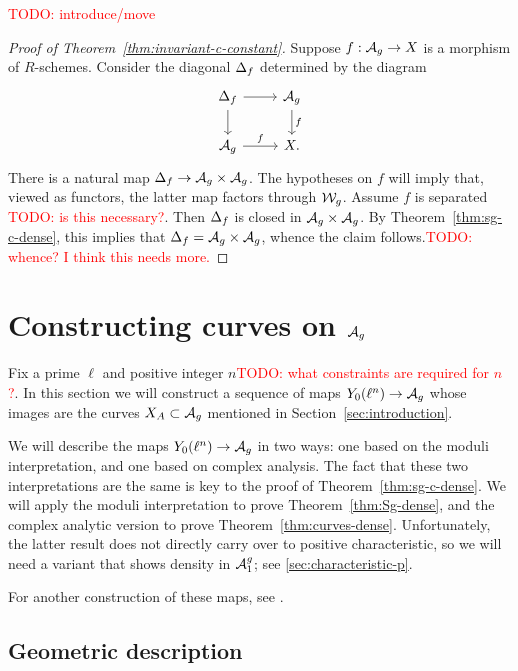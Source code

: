 \documentclass{amsart}
\begin{document}
\textcolor{red}{TODO: introduce/move}

\begin{proof}[Proof of Theorem~\ref{thm:invariant-c-constant}]
  Suppose $f: \mathcal{A}_g \to X$ is a morphism of $R$-schemes. Consider the diagonal $\Delta_f$ determined by the diagram
  \[
  \begin{tikzcd}
    \df \arrow[r] \arrow[d] & \ag \arrow[d,"f"]
    \\
    \ag \arrow[r,"f"] & X.
  \end{tikzcd}
  \]
  There is a natural map $\Delta_f \to \mathcal{A}_g \times \mathcal{A}_g$. The hypotheses on $f$ will imply that, viewed as functors, the latter map factors through $\mathcal{W}_g$.
  Assume $f$ is separated \textcolor{red}{TODO: is this necessary?}.
  Then $\Delta_f$ is closed in $\mathcal{A}_g \times \mathcal{A}_g$. By Theorem~\ref{thm:sg-c-dense}, this implies that $\Delta_f = \mathcal{A}_g \times \mathcal{A}_g$, whence the claim follows.\textcolor{red}{TODO: whence? I think this needs more.}
\end{proof}



\section{Constructing curves on $\mathcal{A}_g$}
\label{sec:curves-on-Ag}

Fix a prime $\ell$ and positive integer $n$\textcolor{red}{TODO: what constraints are required for $n$?}. In this section we will construct a sequence of maps $Y_0(\ell^n) \to \mathcal{A}_g$ whose images are the curves $X_A \subset \mathcal{A}_g$ mentioned in Section~\ref{sec:introduction}.

We will describe the maps $Y_0(\ell^n) \to \mathcal{A}_g$ in two ways: one based on the moduli interpretation, and one based on complex analysis. The fact that these two interpretations are the same is key to the proof of Theorem~\ref{thm:sg-c-dense}. We will apply the moduli interpretation to prove Theorem~\ref{thm:Sg-dense}, and the complex analytic version to prove Theorem~\ref{thm:curves-dense}. Unfortunately, the latter result does not directly carry over to positive characteristic, so we will need a variant that shows density in $\mathcal{A}_1^g$; see \ref{sec:characteristic-p}.

For another construction of these maps, see \cite[p. 19 et seq.]{rains}.

\subsection{Geometric description}
\label{sec:geo-desc}
\end{document}
